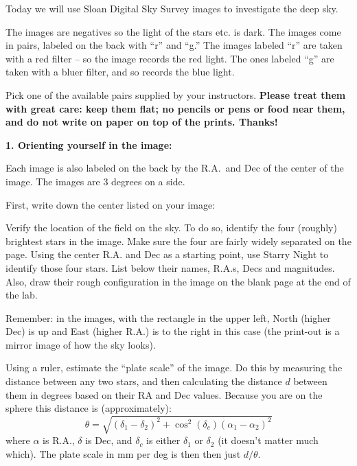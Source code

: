 
\noindent Today we will use Sloan Digital Sky Survey images
to investigate the deep sky.  

The images are negatives so the light of the stars etc. is dark. The
images come in pairs, labeled on the back with ``r'' and ``g.''  The
images labeled ``r'' are taken with a red filter -- so the image
records the red light. The ones labeled ``g'' are taken with a bluer
filter, and so records the blue light.

Pick one of the available pairs supplied by your instructors.  {\bf
Please treat them with great care: keep them flat; no pencils or pens
or food near them, and do not write on paper on top of the
prints. Thanks!}

\noindent
{\bf 1. Orienting yourself in the image:} 

\noindent Each image is also labeled on the back by the 
R.A.~and Dec of the center of the image. The images are 3 degrees on a
side.

\noindent First, write down the center listed on your
image:

\vspace{40pt}

\noindent Verify the location of the field on the sky. To do so,
identify the four (roughly) brightest stars in the image. Make sure
the four are fairly widely separated on the page.  Using the center
R.A. and Dec as a starting point, use Starry Night to identify those
four stars. List below their names, R.A.s, Decs and magnitudes. Also,
draw their rough configuration in the image on the blank page at the
end of the lab.

\noindent Remember: in the images, with the rectangle in the upper
left, North (higher Dec) is up and East (higher R.A.) is to the right
in this case (the print-out is a mirror image of how the sky looks).

\clearpage


\noindent Using a ruler, estimate the ``plate scale'' of the image. Do
this by measuring the distance between any two stars, and then
calculating the distance $d$ between them in degrees based on their RA and
Dec values. Because you are on the sphere this distance is
(approximately):
\begin{equation}
\theta = \sqrt{(\delta_1 - \delta_2)^2 + \cos^2(\delta_c)(\alpha_1
- \alpha_2)^2} 
\end{equation}
where $\alpha$ is R.A., $\delta$ is Dec, and $\delta_c$ is either
$\delta_1$ or $\delta_2$ (it doesn't matter much which).  The plate
scale in mm per deg is then then just $d/\theta$.

